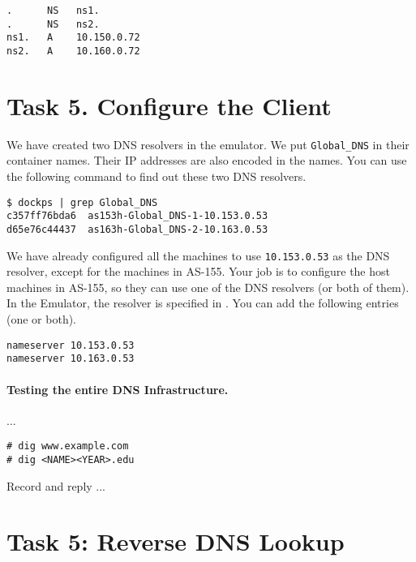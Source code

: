 \begin{lstlisting}
.      NS   ns1.
.      NS   ns2.
ns1.   A    10.150.0.72
ns2.   A    10.160.0.72
\end{lstlisting}
 





\section{Task 5. Configure the Client} 


We have created two DNS resolvers in the emulator. We put \texttt{Global\_DNS} in 
their container names. Their IP addresses are also encoded in the names. 
You can use the following command to find out these two DNS resolvers. 

\begin{lstlisting}
$ dockps | grep Global_DNS
c357ff76bda6  as153h-Global_DNS-1-10.153.0.53
d65e76c44437  as163h-Global_DNS-2-10.163.0.53
\end{lstlisting}
 
We have already configured all the machines to use \texttt{10.153.0.53} 
as the DNS resolver, except for the machines in AS-155. Your job is to
configure the host machines in AS-155, so they can use one 
of the DNS resolvers (or both of them).
In the Emulator, the resolver is specified in . 
You can add the following entries (one or both). 

\begin{lstlisting}
nameserver 10.153.0.53
nameserver 10.163.0.53
\end{lstlisting}


\paragraph{Testing the entire DNS Infrastructure.} 
...



\begin{lstlisting}
# dig www.example.com
# dig <NAME><YEAR>.edu 
\end{lstlisting}


Record and reply ...
 



\section{Task 5: Reverse DNS Lookup} 






